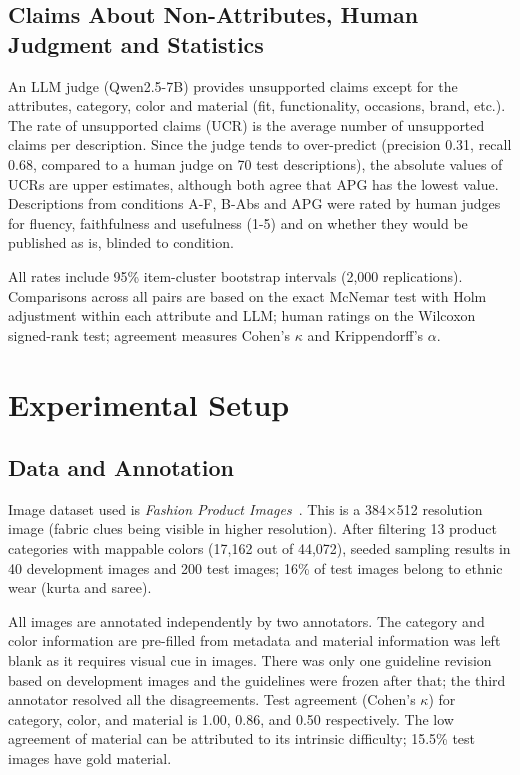 \documentclass[runningheads]{llncs}
\newcommand{\cond}[1]{\textsf{#1}}
\begin{document}
\subsection{Claims About Non-Attributes, Human Judgment and Statistics}
An LLM judge (Qwen2.5-7B) provides unsupported claims except for the attributes, category, color and material (fit, functionality, occasions, brand, etc.). The rate of unsupported claims (UCR) is the average number of unsupported claims per description. Since the judge tends to over-predict (precision 0.31, recall 0.68, compared to a human judge on 70 test descriptions), the absolute values of UCRs are upper estimates, although both agree that \cond{APG} has the lowest value. Descriptions from conditions \cond{A-F}, \cond{B-Abs} and \cond{APG} were rated by human judges for fluency, faithfulness and usefulness (1-5) and on whether they would be published as is, blinded to condition.

All rates include 95\% item-cluster bootstrap intervals (2,000 replications). Comparisons across all pairs are based on the exact McNemar test with Holm adjustment within each attribute and LLM; human ratings on the Wilcoxon signed-rank test; agreement measures Cohen's $\kappa$ and Krippendorff's $\alpha$.

\section{Experimental Setup}\label{sec:setup}
\subsection{Data and Annotation}
Image dataset used is \emph{Fashion Product Images}~\cite{aggarwal2019fashion}. This is a 384$\times$512 resolution image (fabric clues being visible in higher resolution). After filtering 13 product categories with mappable colors (17,162 out of 44,072), seeded sampling results in 40 development images and 200 test images; 16\% of test images belong to ethnic wear (kurta and saree).

All images are annotated independently by two annotators. The category and color information are pre-filled from metadata and material information was left blank as it requires visual cue in images. There was only one guideline revision based on development images and the guidelines were frozen after that; the third annotator resolved all the disagreements. Test agreement (Cohen's $\kappa$) for category, color, and material is 1.00, 0.86, and 0.50 respectively. The low agreement of material can be attributed to its intrinsic difficulty; 15.5\% test images have gold material.
\end{document}
